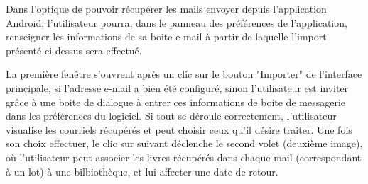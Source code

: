 \begin{figure}[htbp]
  \begin{center}
    \leavevmode
  \end{center}
\end{figure}

Dans l'optique de pouvoir récupérer les mails envoyer depuis l'application Android, l'utilisateur pourra, dans le panneau des préférences de l'application, renseigner les informations de sa boite e-mail à partir de laquelle l'import présenté ci-dessus sera effectué.

\newpage{}

\begin{figure}[htbp]
  \begin{center}
    \leavevmode
    \hspace{1cm}
    \leavevmode
  \end{center}
\end{figure}

La première fenêtre s'ouvrent après un clic sur le bouton "Importer" de l'interface principale, si l'adresse e-mail a bien été configuré, sinon l'utilisateur est inviter grâce à une boite de dialogue à entrer ces informations de boite de messagerie dans les préférences du logiciel. Si tout se déroule correctement, l'utilisateur visualise les courriels récupérés et peut choisir ceux qu'il désire traiter. Une fois son choix effectuer, le clic sur suivant déclenche le second volet (deuxième image), où l'utilisateur peut associer les livres récupérés dans chaque mail (correspondant à un lot) à une bilbiothèque, et lui affecter une date de retour.


